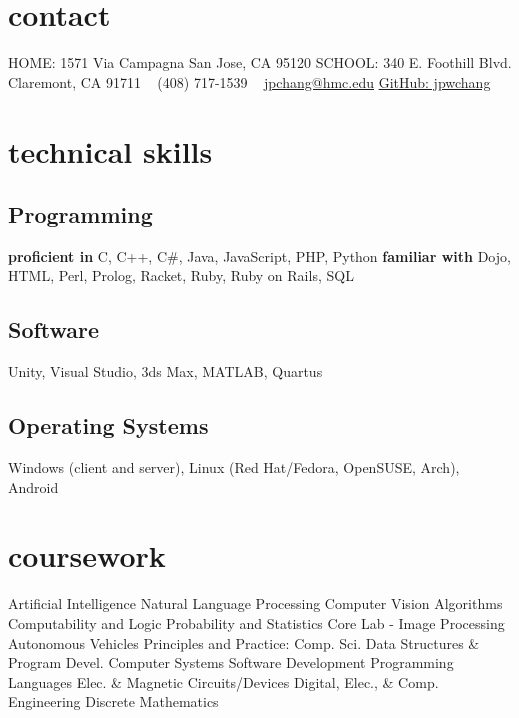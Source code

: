 \documentclass[print]{friggeri-cv} %
\begin{document}


\begin{aside} %
\section{contact}
HOME:
1571 Via Campagna
San Jose, CA 95120
SCHOOL:
340 E. Foothill Blvd.
Claremont, CA 91711
~
(408) 717-1539
~
\href{mailto:jpchang@hmc.edu}{jpchang@hmc.edu}
\href{https://github.com/jpwchang}{GitHub: jpwchang}
\section{technical skills}
\subsection{Programming}
\textbf{proficient in}
C, C++, C\#, Java, JavaScript, PHP, Python
\textbf{familiar with}
Dojo, HTML, Perl, Prolog, Racket, Ruby, Ruby on Rails, SQL
\subsection{Software}
Unity, Visual Studio, 3ds Max, MATLAB, Quartus
\subsection{Operating Systems}
Windows (client and server), Linux (Red Hat/Fedora, OpenSUSE, Arch), Android
\section{coursework}
Artificial Intelligence
Natural Language Processing
Computer Vision
Algorithms
Computability and Logic
Probability and Statistics
Core Lab - Image Processing
Autonomous Vehicles
Principles and Practice: Comp. Sci.
Data Structures \& Program Devel.
Computer Systems
Software Development
Programming Languages
Elec. \& Magnetic Circuits/Devices
Digital, Elec., \& Comp. Engineering
Discrete Mathematics
\end{aside}
\end{document}
